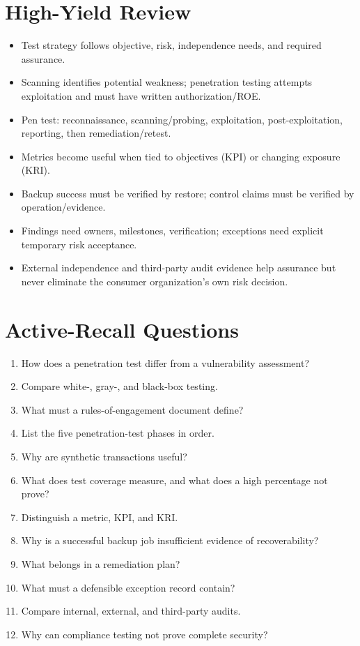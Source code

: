 \documentclass[10pt,letterpaper]{article}
\begin{document}
\section{High-Yield Review}
\begin{itemize}
\item Test strategy follows objective, risk, independence needs, and required assurance.
\item Scanning identifies potential weakness; penetration testing attempts exploitation and must have written authorization/ROE.
\item Pen test: reconnaissance, scanning/probing, exploitation, post-exploitation, reporting, then remediation/retest.
\item Metrics become useful when tied to objectives (KPI) or changing exposure (KRI).
\item Backup success must be verified by restore; control claims must be verified by operation/evidence.
\item Findings need owners, milestones, verification; exceptions need explicit temporary risk acceptance.
\item External independence and third-party audit evidence help assurance but never eliminate the consumer organization's own risk decision.
\end{itemize}

\section{Active-Recall Questions}
\begin{enumerate}
\item How does a penetration test differ from a vulnerability assessment?
\item Compare white-, gray-, and black-box testing.
\item What must a rules-of-engagement document define?
\item List the five penetration-test phases in order.
\item Why are synthetic transactions useful?
\item What does test coverage measure, and what does a high percentage not prove?
\item Distinguish a metric, KPI, and KRI.
\item Why is a successful backup job insufficient evidence of recoverability?
\item What belongs in a remediation plan?
\item What must a defensible exception record contain?
\item Compare internal, external, and third-party audits.
\item Why can compliance testing not prove complete security?
\end{enumerate}
\end{document}
